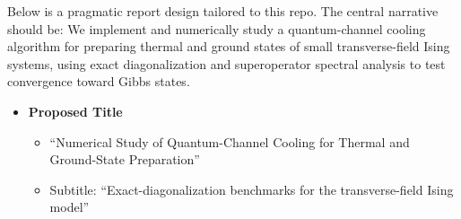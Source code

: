 \documentclass[11pt,a4paper]{article}
\begin{document}
 Below is a pragmatic report design tailored to this repo. The central narrative should be: 
 We implement and numerically study a quantum-channel cooling algorithm for preparing thermal and ground states of small transverse-field Ising systems, using exact diagonalization and superoperator spectral analysis to test convergence toward Gibbs states.

\begin{itemize}
  \item \textbf{Proposed Title}
  \begin{itemize}
    \item “Numerical Study of Quantum-Channel Cooling for Thermal and Ground-State Preparation”
    \item Subtitle: “Exact-diagonalization benchmarks for the transverse-field Ising model”
  \end{itemize}
\end{itemize}
\end{document}
